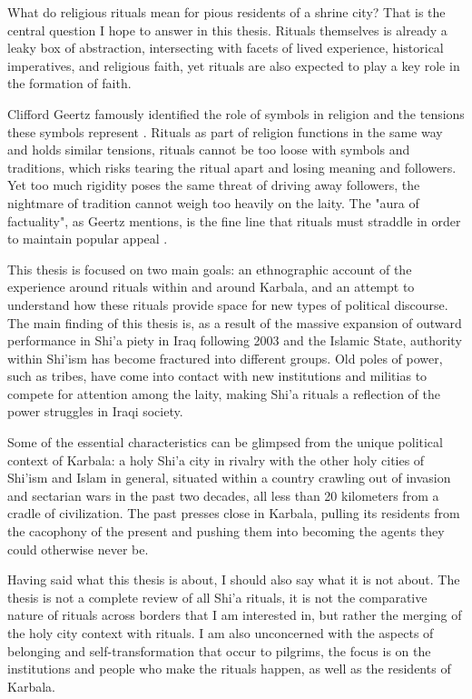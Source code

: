 What do religious rituals mean for pious residents of a shrine city? That is the central question I hope to answer in this thesis. Rituals themselves is already a leaky box of abstraction, intersecting with facets of lived experience, historical imperatives, and religious faith, yet rituals are also expected to play a key role in the formation of faith. 

Clifford Geertz famously identified the role of symbols in religion and the tensions these symbols represent \cite{geertz_interpretation_1993}. Rituals as part of religion functions in the same way and holds similar tensions, rituals cannot be too loose with symbols and traditions, which risks tearing the ritual apart and losing meaning and followers. Yet too much rigidity poses the same threat of driving away followers, the nightmare of tradition cannot weigh too heavily on the laity. The "aura of factuality", as Geertz mentions, is the fine line that rituals must straddle in order to maintain popular appeal \cite[90]{geertz_interpretation_1993}. 

This thesis is focused on two main goals: an ethnographic account of the experience around rituals within and around Karbala, and an attempt to understand how these rituals provide space for new types of political discourse. The main finding of this thesis is, as a result of the massive expansion of outward performance in Shi'a piety in Iraq following 2003 and the Islamic State, authority within Shi'ism has become fractured into different groups. Old poles of power, such as tribes, have come into contact with new institutions and militias to compete for attention among the laity, making Shi'a rituals a reflection of the power struggles in Iraqi society. 

Some of the essential characteristics can be glimpsed from the unique political context of Karbala: a holy Shi'a city in rivalry with the other holy cities of Shi'ism and Islam in general, situated within a country crawling out of invasion and sectarian wars in the past two decades, all less than 20 kilometers from a cradle of civilization. The past presses close in Karbala, pulling its residents from the cacophony of the present and pushing them into becoming the agents they could otherwise never be. 

Having said what this thesis is about, I should also say what it is not about. The thesis is not a complete review of all Shi'a rituals, it is not the comparative nature of rituals across borders that I am interested in, but rather the merging of the holy city context with rituals. I am also unconcerned with the aspects of belonging and self-transformation that occur to pilgrims, the focus is on the institutions and people who make the rituals happen, as well as the residents of Karbala. 

